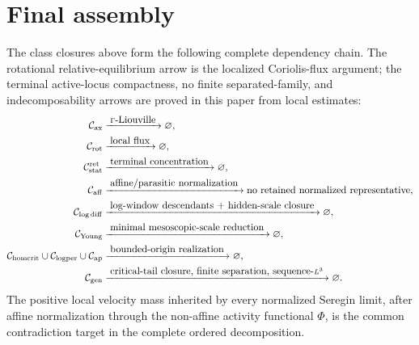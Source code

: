 \documentclass[11pt]{amsart}
\numberwithin{equation}{section}
\theoremstyle{plain}
\theoremstyle{definition}
\theoremstyle{remark}
\newcommand{\Cax}{\mathcal C_{\mathrm{ax}}}
\newcommand{\Crot}{\mathcal C_{\mathrm{rot}}}
\newcommand{\Cstat}{\mathcal C_{\mathrm{stat}}^{\mathrm{ret}}}
\newcommand{\Caff}{\mathcal C_{\mathrm{aff}}}
\newcommand{\Cgen}{\mathcal C_{\mathrm{gen}}}
\newcommand{\Chomcrit}{\mathcal C_{\mathrm{homcrit}}}
\newcommand{\Clogper}{\mathcal C_{\mathrm{logper}}}
\newcommand{\Capcrit}{\mathcal C_{\mathrm{ap}}}
\newcommand{\Cyoung}{\mathcal C_{\mathrm{Young}}}
\newcommand{\Clogdiff}{\mathcal C_{\log\mathrm{diff}}}
\begin{document}
\section{Final assembly}
\label{sec:final-assembly}

The class closures above form the following complete dependency chain.  The rotational
relative-equilibrium arrow is the localized Coriolis-flux argument; the terminal
active-locus compactness, no finite separated-family, and indecomposability
arrows are proved in this paper from local estimates:
\[
\begin{aligned}
\Cax
   &\xrightarrow{\;\Gamma\hbox{-Liouville}\;}
   \varnothing,\\
\Crot
   &\xrightarrow{\;\hbox{local flux}\;}
   \varnothing,\\
\Cstat
   &\xrightarrow{\;\hbox{terminal concentration}\;}
   \varnothing,\\
\Caff
   &\xrightarrow{\;\hbox{affine/parasitic normalization}\;}
   \hbox{no retained normalized representative},\\
\Clogdiff
   &\xrightarrow{\;\hbox{log-window descendants + hidden-scale closure}\;}
   \varnothing,\\
\Cyoung
   &\xrightarrow{\;\hbox{minimal mesoscopic-scale reduction}\;}
   \varnothing,\\
\Chomcrit\cup\Clogper\cup\Capcrit
   &\xrightarrow{\;\hbox{bounded-origin realization}\;}
   \varnothing,\\
\Cgen
   &\xrightarrow{\;\hbox{critical-tail closure, finite separation, sequence-}L^3\;}
   \varnothing .
\end{aligned}
\]
The positive local velocity mass inherited by every normalized Seregin limit,
after affine normalization through the non-affine activity functional
\(\Phi\), is the common contradiction target in the complete ordered
decomposition.
\end{document}
